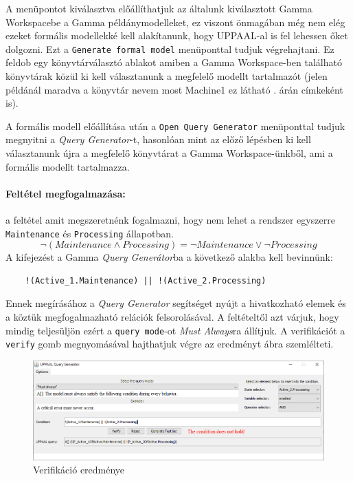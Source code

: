 A menüpontot kiválasztva előállíthatjuk az általunk kiválasztott Gamma Workspacebe a Gamma példánymodelleket, ez viszont önmagában még nem elég ezeket formális modellekké kell alakítanunk, hogy UPPAAL-al is fel lehessen őket dolgozni. Ezt a \verb+Generate formal model+ menüponttal tudjuk végrehajtani. Ez feldob egy könyvtárválasztó ablakot amiben a Gamma Workspace-ben található könyvtárak közül ki kell választanunk a megfelelő modellt tartalmazót (jelen példánál maradva a könyvtár nevem most Machine1 ez látható . árán címkeként is).

A formális modell előállítása után a \verb+Open Query Generator+ menüponttal tudjuk megnyitni a \emph{Query Generator}-t, hasonlóan mint az előző lépésben ki kell választanunk újra a megfelelő könyvtárat a Gamma Workspace-ünkből, ami a formális modellt tartalmazza.

\paragraph{Feltétel megfogalmazása: } a feltétel amit megszeretnénk fogalmazni, hogy nem lehet a rendszer egyszerre \verb+Maintenance+ és \verb+Processing+ állapotban.
\[ \neg(Maintenance  \land Processing) = \neg Maintenance \lor \neg Processing \]
A kifejezést a Gamma \emph{Query Generátor}ba a következő alakba kell bevinnünk:
\begin{lstlisting}
	!(Active_1.Maintenance) || !(Active_2.Processing)
\end{lstlisting}
Ennek megírásához a \emph{Query Generator} segítséget nyújt a hivatkozható elemek és a köztük megfogalmazható relációk felsorolásával. A feltételtől azt várjuk, hogy mindig teljesüljön ezért a \verb+query mode+-ot \emph{Must Always}ra állítjuk. A verifikációt a \verb+verify+ gomb megnyomásával hajthatjuk végre az eredményt   ábra szemlélteti.
\begin{figure}[H]
	\centering
	\includegraphics[keepaspectratio, width=150mm]{figures/query-gen-result.png}
	\caption{Verifikáció eredménye}
	\label{fig:query-gen-res}
\end{figure}

